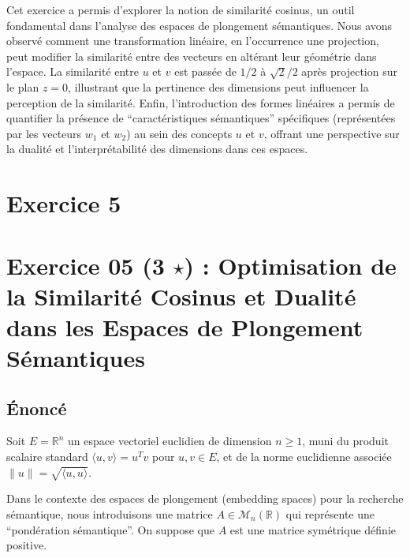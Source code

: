 \documentclass[11pt,a4paper]{report}
\begin{document}
Cet exercice a permis d'explorer la notion de similarité cosinus, un
outil fondamental dans l'analyse des espaces de plongement sémantiques.
Nous avons observé comment une transformation linéaire, en l'occurrence
une projection, peut modifier la similarité entre des vecteurs en
altérant leur géométrie dans l'espace. La similarité entre \(u\) et
\(v\) est passée de \(1/2\) à \(\sqrt{2}/2\) après projection sur le
plan \(z=0\), illustrant que la pertinence des dimensions peut
influencer la perception de la similarité. Enfin, l'introduction des
formes linéaires a permis de quantifier la présence de
``caractéristiques sémantiques'' spécifiques (représentées par les
vecteurs \(w_1\) et \(w_2\)) au sein des concepts \(u\) et \(v\),
offrant une perspective sur la dualité et l'interprétabilité des
dimensions dans ces espaces.


\section*{Exercice 5}
\hypertarget{exercice-05-3-star-optimisation-de-la-similarituxe9-cosinus-et-dualituxe9-dans-les-espaces-de-plongement-suxe9mantiques}{%
\section{\texorpdfstring{Exercice 05 (3 \(\star\)) : Optimisation de la
Similarité Cosinus et Dualité dans les Espaces de Plongement
Sémantiques}{Exercice 05 (3 \textbackslash star) : Optimisation de la Similarité Cosinus et Dualité dans les Espaces de Plongement Sémantiques}}\label{exercice-05-3-star-optimisation-de-la-similarituxe9-cosinus-et-dualituxe9-dans-les-espaces-de-plongement-suxe9mantiques}}

\hypertarget{uxe9noncuxe9}{%
\subsection{Énoncé}\label{uxe9noncuxe9}}

Soit \(E = \mathbb{R}^n\) un espace vectoriel euclidien de dimension
\(n \ge 1\), muni du produit scalaire standard
\(\langle u, v \rangle = u^T v\) pour \(u, v \in E\), et de la norme
euclidienne associée \(\|u\| = \sqrt{\langle u, u \rangle}\).

Dans le contexte des espaces de plongement (embedding spaces) pour la
recherche sémantique, nous introduisons une matrice
\(A \in \mathcal{M}_n(\mathbb{R})\) qui représente une ``pondération
sémantique''. On suppose que \(A\) est une matrice symétrique définie
positive.
\end{document}
